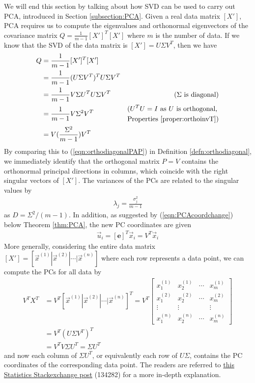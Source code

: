 We will end this section by talking about how SVD can be used to carry out PCA, introduced in Section \ref{subsection:PCA}. Given a real data matrix $[X']$, PCA requires us to compute the eigenvalues and orthonormal eigenvectors of the covariance matrix $Q = \frac{1}{m-1}[X']^T[X']$ where $m$ is the number of data. If we know that the SVD of the data matrix is $[X'] = U\Sigma V^T$, then we have
\begin{align}
Q &= \frac{1}{m-1}[X']^T[X'] \nonumber \\
&= \frac{1}{m-1}(U\Sigma V^T)^TU\Sigma V^T \nonumber \\
&= \frac{1}{m-1}V \Sigma U^T U \Sigma V^T & \text{($\Sigma$ is diagonal)} \nonumber \\
&= \frac{1}{m-1}V \Sigma^2 V^T & \begin{aligned}
&\text{($U^TU = I$ as $U$ is orthogonal,} \\
&\text{Properties \ref{proper:orthoinvT})}
\end{aligned}\nonumber \\
&= V(\frac{\Sigma^2}{m-1}) V^T 
\end{align}
By comparing this to (\ref{eqn:orthodiagonalPAP}) in Definition \ref{defn:orthodiagonal}, we immediately identify that the orthogonal matrix $P = V$ contains the orthonormal principal directions in columns, which coincide with the right singular vectors of $[X']$. The variances of the PCs are related to the singular values by 
\begin{align}
\lambda_j = \frac{\sigma_j^2}{m-1}    
\end{align} as $D = \Sigma^2/(m-1)$. In addition, as suggested by (\ref{eqn:PCAcoordchange}) below Theorem \ref{thm:PCA}, the new PC coordinates are given \begin{align}
\vec{u}_i = [\textbf{e}]^T \vec{x}_i = V^T \vec{x}_i    
\end{align}
More generally, considering the entire data matrix $[X'] = [\vec{x}^{(1)}|\vec{x}^{(2)}|\cdots|\vec{x}^{(n)}]$ where each row represents a data point, we can compute the PCs for all data by
\begin{align}
V^TX^T &= V^T[\vec{x}^{(1)}|\vec{x}^{(2)}|\cdots|\vec{x}^{(n)}]^T = V^T
\begin{bmatrix}
x^{(1)}_1 & x^{(1)}_2 & \cdots & x^{(1)}_m \\
x^{(2)}_1 & x^{(2)}_2 & \cdots & x^{(2)}_m \\
\vdots & \vdots & & \vdots \\
x^{(n)}_1 & x^{(n)}_2 & \cdots & x^{(n)}_m
\end{bmatrix} \nonumber \\
&= V^T(U\Sigma V^T)^T \nonumber \\
&= V^TV \Sigma U^T = \Sigma U^T
\end{align}
and now each column of $\Sigma U^T$, or equivalently each row of $U\Sigma$, contains the PC coordinates of the corresponding data point. The readers are referred to \href{https://stats.stackexchange.com/questions/134282/relationship-between-svd-and-pca-how-to-use-svd-to-perform-pca}{this Statistics Stackexchange post} (134282) for a more in-depth explanation.

